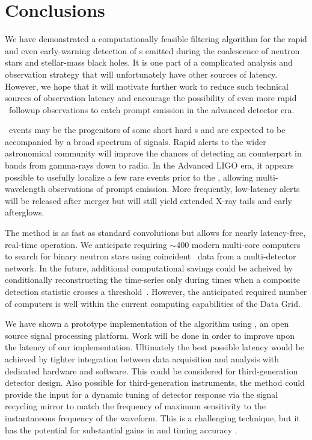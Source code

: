 \section{Conclusions}
\label{sec:conclusions}

We have demonstrated a computationally feasible filtering algorithm for the rapid and
even early-warning detection of \GW{}s emitted during the coalescence
of neutron stars and stellar-mass black holes.  It is one part of a complicated
analysis and observation strategy that will unfortunately have other sources of
latency.  However, we hope that it will motivate further work to reduce such
technical sources of \GW{} observation latency and encourage the possibility of
even more rapid \EM\ followup observations to catch prompt emission in the
advanced detector era.

\CBC\ events may be the progenitors of some short hard \GRB{}s and are expected
to be accompanied by a broad spectrum of \EM{} signals. Rapid alerts to the
wider astronomical community will improve the chances of detecting an \EM{}
counterpart in bands from gamma-rays down to radio. In the Advanced LIGO
era, it appears possible to usefully localize a few rare events prior to the
\GRB{}, allowing multi-wavelength observations of prompt emission. More
frequently, low-latency alerts will be released after merger but will still
yield extended X-ray tails and early afterglows.

The \lloid{} method is as fast as standard \fft{} convolutions but allows for
nearly latency-free, real-time operation.  We anticipate requiring $\sim$400
modern multi-core computers to search for binary neutron stars using
coincident \GW\ data from a multi-detector network.  In the future, additional
computational savings could be acheived by conditionally reconstructing the
\SNR{} time-series only during times when a composite detection statistic
crosses a threshold~\citep{svd-compdetstat}.  However, the anticipated required
number of computers is well within the current computing capabilities of the
\LIGO{} Data Grid.

We have shown a prototype implementation of the \lloid{} algorithm using
\gstreamer, an open source signal processing platform.  Work will be done in
order to improve upon the latency of our implementation.  Ultimately the best
possible latency would be achieved by tighter integration between data
acquisition and analysis with dedicated hardware and software. This could be
considered for third-generation detector design.  Also possible for
third-generation instruments, the \lloid{} method could provide the input for a
dynamic tuning of detector response via the signal recycling mirror to match
the frequency of maximum sensitivity to the instantaneous frequency of the
\GW{} waveform.  This is a challenging technique, but it has the potential for
substantial gains in \SNR{} and timing accuracy \citep{PhysRevD.47.2184}.

